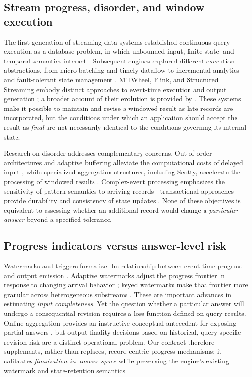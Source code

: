 \documentclass[conference]{IEEEtran}
\begin{document}
\subsection{Stream progress, disorder, and window execution}
The first generation of streaming data systems established continuous-query execution as a database problem, in which unbounded input, finite state, and temporal semantics interact \cite{babcock2002streams,abadi2003aurora,golab2003issues,stonebraker2005requirements,abadi2005borealis,arasu2006cql}. Subsequent engines explored different execution abstractions, from micro-batching and timely dataflow to incremental analytics and fault-tolerant state management \cite{zaharia2013dstreams,murray2013naiad,chandramouli2014trill,carbone2017flinkstate}. MillWheel, Flink, and Structured Streaming embody distinct approaches to event-time execution and output generation \cite{akidau2013millwheel,carbone2015flink,armbrust2018structured}; a broader account of their evolution is provided by \cite{fragkoulis2024survey}. These systems make it possible to maintain and revise a windowed result as late records are incorporated, but the conditions under which an application should accept the result as \emph{final} are not necessarily identical to the conditions governing its internal state.

Research on disorder addresses complementary concerns. Out-of-order architectures and adaptive buffering alleviate the computational costs of delayed input \cite{li2008ooo,chandramouli2018impatience}, while specialized aggregation structures, including Scotty, accelerate the processing of windowed results \cite{traub2018scotty,traub2021scotty}. Complex-event processing emphasizes the sensitivity of pattern semantics to arriving records \cite{wu2006cep,cugola2012cep}; transactional approaches provide durability and consistency of state updates \cite{meehan2015sstore}. None of these objectives is equivalent to assessing whether an additional record would change a \emph{particular answer} beyond a specified tolerance.

\subsection{Progress indicators versus answer-level risk}
Watermarks and triggers formalize the relationship between event-time progress and output emission \cite{akidau2015dataflow}. Adaptive watermarks adjust the progress frontier in response to changing arrival behavior \cite{awad2019adaptive}; keyed watermarks make that frontier more granular across heterogeneous substreams \cite{yasser2025keyed}. These are important advances in estimating \emph{input completeness}. Yet the question whether a particular answer will undergo a consequential revision requires a loss function defined on query results. Online aggregation provides an instructive conceptual antecedent for exposing partial answers \cite{hellerstein1997online}, but output-finality decisions based on historical, query-specific revision risk are a distinct operational problem. Our contract therefore supplements, rather than replaces, record-centric progress mechanisms: it calibrates \emph{finalization in answer space} while preserving the engine's existing watermark and state-retention semantics.
\end{document}
